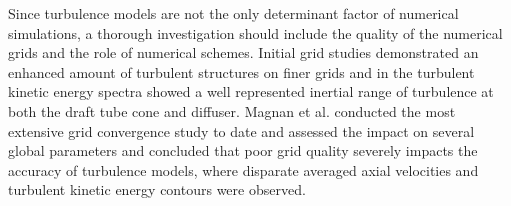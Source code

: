 
Since turbulence models are not the only determinant factor of numerical simulations, a thorough investigation should include the quality of the numerical grids and the role of numerical schemes. Initial grid studies \cite{stein2006numerical, krappel2014investigation} demonstrated an enhanced amount of turbulent structures on finer grids and in \cite{krappel2014investigation} the turbulent kinetic energy spectra showed a well represented inertial range of turbulence at both the draft tube cone and diffuser. %
Magnan et al. \cite{magnan2014challenges} conducted the most extensive grid convergence study to date and assessed the impact on several global parameters and concluded that poor grid quality severely impacts the accuracy of turbulence models, where disparate averaged axial velocities and turbulent kinetic energy contours were observed. %


